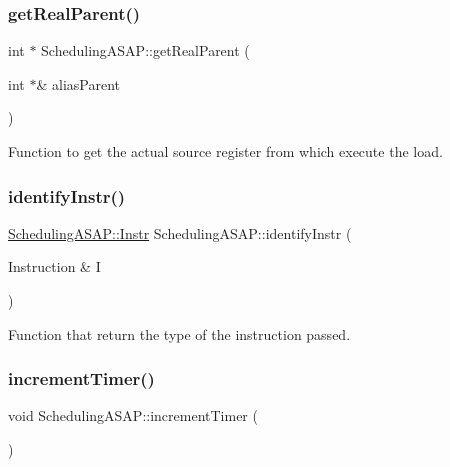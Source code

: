 \subsubsection{\texorpdfstring{get\+Real\+Parent()}{getRealParent()}}
{\footnotesize\ttfamily int $\ast$ Scheduling\+A\+S\+A\+P\+::get\+Real\+Parent (\begin{DoxyParamCaption}\item[{int $\ast$\&}]{alias\+Parent }\end{DoxyParamCaption})}



Function to get the actual source register from which execute the load. 

\mbox{\label{classoctantis_1_1SchedulingASAP_ac3f43eaa890ea2fe4457d0505b28da77}} 
\subsubsection{\texorpdfstring{identify\+Instr()}{identifyInstr()}}
{\footnotesize\ttfamily \hyperlink{classoctantis_1_1SchedulingASAP_abbd454a56c823d34f835168cc31168f4}{Scheduling\+A\+S\+A\+P\+::\+Instr} Scheduling\+A\+S\+A\+P\+::identify\+Instr (\begin{DoxyParamCaption}\item[{Instruction \&}]{I }\end{DoxyParamCaption})}



Function that return the type of the instruction passed. 

\mbox{\label{classoctantis_1_1SchedulingASAP_a8b0a9d978d7b4276b1c741779a5e4191}} 
\subsubsection{\texorpdfstring{increment\+Timer()}{incrementTimer()}}
{\footnotesize\ttfamily void Scheduling\+A\+S\+A\+P\+::increment\+Timer (\begin{DoxyParamCaption}{ }\end{DoxyParamCaption})}



